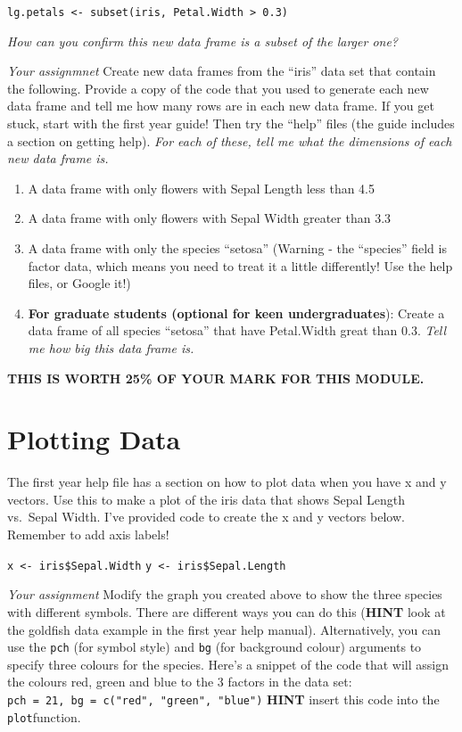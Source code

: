 \documentclass[]{book}
\begin{document}
\texttt{lg.petals\ \textless{}-\ subset(iris,\ Petal.Width\ \textgreater{}\ 0.3)}

\emph{How can you confirm this new data frame is a subset of the larger one?}

\emph{Your assignmnet} Create new data frames from the ``iris'' data set that contain the following. Provide a copy of the code that you used to generate each new data frame and tell me how many rows are in each new data frame. If you get stuck, start with the first year guide! Then try the ``help'' files (the guide includes a section on getting help). \emph{For each of these, tell me what the dimensions of each new data frame is.}

\begin{enumerate}
\def\labelenumi{\arabic{enumi}.}
\item
  A data frame with only flowers with Sepal Length less than 4.5
\item
  A data frame with only flowers with Sepal Width greater than 3.3
\item
  A data frame with only the species ``setosa'' (Warning - the ``species'' field is factor data, which means you need to treat it a little differently! Use the help files, or Google it!)
\item
  \textbf{For graduate students (optional for keen undergraduates}): Create a data frame of all species ``setosa'' that have Petal.Width great than 0.3. \emph{Tell me how big this data frame is.}
\end{enumerate}

\textbf{THIS IS WORTH 25\% OF YOUR MARK FOR THIS MODULE.}

\hypertarget{plotting-data}{%
\chapter{Plotting Data}\label{plotting-data}}

The first year help file has a section on how to plot data when you have x and y vectors. Use this to make a plot of the iris data that shows Sepal Length vs.~Sepal Width. I've provided code to create the x and y vectors below. Remember to add axis labels!

\texttt{x\ \textless{}-\ iris\$Sepal.Width}
\texttt{y\ \textless{}-\ iris\$Sepal.Length}

\emph{Your assignment} Modify the graph you created above to show the three species with different symbols. There are different ways you can do this (\textbf{HINT} look at the goldfish data example in the first year help manual). Alternatively, you can use the \texttt{pch} (for symbol style) and \texttt{bg} (for background colour) arguments to specify three colours for the species. Here's a snippet of the code that will assign the colours red, green and blue to the 3 factors in the data set: \texttt{pch\ =\ 21,\ bg\ =\ c("red",\ "green",\ "blue")} \textbf{HINT} insert this code into the \texttt{plot}function.
\end{document}
